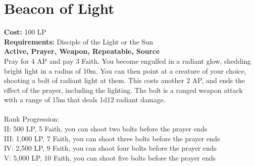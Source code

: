 \section{Beacon of Light}\label{prayer:beaconOfLight}
\textbf{Cost:} 100 LP\\
\textbf{Requirements:} Disciple of the Light or the Sun \\
\textbf{Active, Prayer, Weapon, Repeatable, Source}\\
Pray for 4 AP and pay 3 Faith.
You become engulfed in a radiant glow, shedding bright light in a radius of 10m.
You can then point at a creature of your choice, shooting a bolt of radiant light at them.
This costs another 2 AP, and ends the effect of the prayer, including the lighting.
The bolt is a ranged weapon attack with a range of 15m that deals 1d12 radiant damage.\\
\\
Rank Progression:\\
II: 500 LP, 5 Faith, you can shoot two bolts before the prayer ends\\
III: 1,000 LP, 7 Faith, you can shoot three bolts before the prayer ends\\
IV: 2,500 LP, 9 Faith, you can shoot four bolts before the prayer ends\\
V: 5,000 LP, 10 Faith, you can shoot five bolts before the prayer ends\\